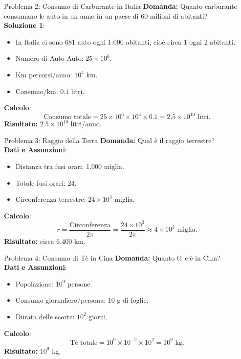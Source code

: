 \documentclass{beamer}
\begin{document}
\begin{frame}{Problema 2: Consumo di Carburante in Italia}
    \textbf{Domanda:} Quanto carburante consumano le auto in un anno in un paese di 60 milioni di abitanti? \\
    \vspace{1em}
    \textbf{Soluzione 1}:
    
    \begin{itemize}
        \item In Italia ci sono 681 auto ogni 1.000 abitanti, cioè circa 1 ogni 2 abitanti.
        \item Numero di Auto Auto: $25 \times 10^6$. \pause
        \item Km percorsi/anno: $10^4$ km. \pause
        \item Consumo/km: $0.1$ litri.
    \end{itemize}
    \pause
    \textbf{Calcolo}:
    \[
    \text{Consumo totale} = 25 \times 10^6 \times 10^4 \times 0.1 = 2.5 \times 10^{10} \text{ litri.}
    \]
    \pause
    \textbf{Risultato:} $2.5 \times 10^{10}$ litri/anno.
\end{frame}

\begin{frame}{Problema 3: Raggio della Terra}
    \textbf{Domanda:} Qual è il raggio terrestre? \\
    \vspace{1em}
    \textbf{Dati e Assunzioni}:
    \begin{itemize}
        \item Distanza tra fusi orari: 1.000 miglia. \pause
        \item Totale fusi orari: 24. \pause
        \item Circonferenza terrestre: $24 \times 10^3$ miglia.
    \end{itemize}
    \pause
    \textbf{Calcolo}:
    \[
    r = \frac{\text{Circonferenza}}{2\pi} = \frac{24 \times 10^3}{2 \pi} \approx 4 \times 10^3 \text{ miglia}.
    \]
    \pause
    \textbf{Risultato:} circa 6.400 km.
\end{frame}

\begin{frame}{Problema 4: Consumo di Tè in Cina}
    \textbf{Domanda:} Quanto tè c'è in Cina? \\
    \vspace{1em}
    \textbf{Dati e Assunzioni}:
    \begin{itemize}
        \item Popolazione: $10^9$ persone. \pause
        \item Consumo giornaliero/persona: 10 g di foglie. \pause
        \item Durata delle scorte: $10^2$ giorni.
    \end{itemize}
    \pause
    \textbf{Calcolo}:
    \[
    \text{Tè totale} = 10^9 \times 10^{-2} \times 10^2 = 10^9 \text{ kg.}
    \]
    \pause
    \textbf{Risultato:} $10^9$ kg.
\end{frame}
\end{document}
